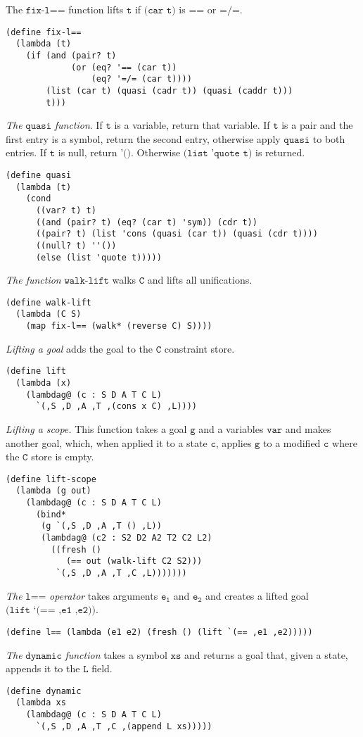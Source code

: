\documentclass[11pt]{article}
\theoremstyle{definition}
\newcommand{\code}[1]{\texttt{#1}}
\newcommand\tab[1][1cm]{\hspace*{#1}}
\begin{document}
\tab The $\code{fix-l==}$ function lifts $\code{t}$ if $\code{(car t)}$ is $\code{==}$ or $\code{=/=}$.
\begin{lstlisting}
(define fix-l==
  (lambda (t)
    (if (and (pair? t)
             (or (eq? '== (car t))
                 (eq? '=/= (car t))))
        (list (car t) (quasi (cadr t)) (quasi (caddr t)))
        t)))
\end{lstlisting}
\tab \textit{The} $\code{quasi}$ \textit{function}. If $\code{t}$ is a variable, return that variable. If $\code{t}$ is a pair and the first entry is a symbol, return the second entry, otherwise apply $\code{quasi}$ to both entries. If $\code{t}$ is null, return $\code{'()}$. Otherwise $\code{(list 'quote t)}$ is returned.
\begin{lstlisting}
(define quasi
  (lambda (t)
    (cond
      ((var? t) t)
      ((and (pair? t) (eq? (car t) 'sym)) (cdr t))
      ((pair? t) (list 'cons (quasi (car t)) (quasi (cdr t))))
      ((null? t) ''())
      (else (list 'quote t)))))
\end{lstlisting}
\tab \textit{The function} $\code{walk-lift}$ walks $\code{C}$ and lifts all unifications.
\begin{lstlisting}
(define walk-lift
  (lambda (C S)
    (map fix-l== (walk* (reverse C) S))))
\end{lstlisting}
\tab \textit{Lifting a goal} adds the goal to the $\code{C}$ constraint store. 
\begin{lstlisting}
(define lift
  (lambda (x)
    (lambdag@ (c : S D A T C L)
      `(,S ,D ,A ,T ,(cons x C) ,L))))
\end{lstlisting}
\textit{Lifting a scope.} This function takes a goal $\code{g}$ and a variables $\code{var}$ and makes another goal, which, when applied it to a state $\code{c}$, applies $\code{g}$ to a modified $\code{c}$ where the $\code{C}$ store is empty.
\begin{lstlisting}
(define lift-scope
  (lambda (g out)
    (lambdag@ (c : S D A T C L)
      (bind*
       (g `(,S ,D ,A ,T () ,L))
       (lambdag@ (c2 : S2 D2 A2 T2 C2 L2)
         ((fresh ()
            (== out (walk-lift C2 S2)))
          `(,S ,D ,A ,T ,C ,L)))))))
\end{lstlisting}
\tab \textit{The} $\code{l==}$ \textit{operator} takes arguments $\mathtt{e_1}$ and $\mathtt{e_2}$ and creates a lifted goal $\code{(lift `(== ,e1 ,e2))}$. 
\begin{lstlisting}
(define l== (lambda (e1 e2) (fresh () (lift `(== ,e1 ,e2)))))
\end{lstlisting}
\tab \textit{The} $\code{dynamic}$ \textit{function} takes a symbol $\code{xs}$ and returns a goal that, given a state, appends it to the $\code{L}$ field.
\begin{lstlisting}
(define dynamic
  (lambda xs
    (lambdag@ (c : S D A T C L)
      `(,S ,D ,A ,T ,C ,(append L xs)))))
\end{lstlisting}
\end{document}
